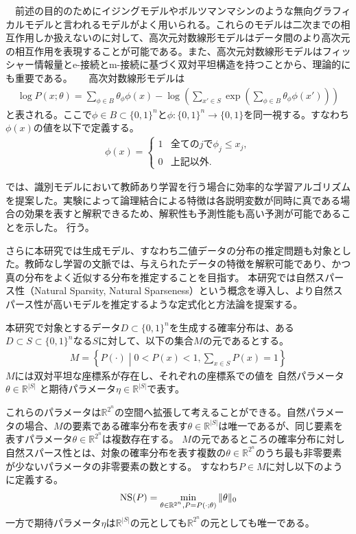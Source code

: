 　前述の目的のためにイジングモデルやボルツマンマシンのような無向グラフィカルモデルと言われるモデルがよく用いられる。これらのモデルは二次までの相互作用しか扱えないのに対して、高次元対数線形モデルはデータ間のより高次元の相互作用を表現することが可能である。また、高次元対数線形モデルはフィッシャー情報量とe-接続とm-接続に基づく双対平坦構造を持つことから、理論的にも重要である。
　
高次対数線形モデルは
\begin{align*}
    \log P(x;\theta) = \sum_{\phi\in B} \theta_\phi \phi(x)  - \log\left( \sum_{x'\in S} \exp\left( \sum_{\phi\in B} \theta_\phi \phi(x') \right) \right)    
\end{align*}
と表される。ここで$\phi \in B \subset \{0,1\}^n$と$\phi:\{0,1\}^n\to \{0,1\} $を同一視する。すなわち$\phi(x)$の値を以下で定義する。
\begin{align*}
    \phi(x)  = \begin{cases}
    1 & 全ての j で　\phi_j \le x_j, \\
    0 & 上記以外.
    \end{cases}
\end{align*}

\cite{LMY01}では、識別モデルにおいて教師あり学習を行う場合に効率的な学習アルゴリズムを提案した。実験によって論理結合による特徴は各説明変数が同時に真である場合の効果を表すと解釈できるため、解釈性も予測性能も高い予測が可能であることを示した。
行う。

さらに本研究では生成モデル、すなわち二値データの分布の推定問題も対象とした。教師なし学習の文脈では、与えられたデータの特徴を解釈可能であり、かつ真の分布をよく近似する分布を推定することを目指す。
本研究では自然スパース性（Natural Sparsity, Natural Sparseness）という概念を導入し、より自然スパース性が高いモデルを推定するような定式化と方法論を提案する。

本研究で対象とするデータ$D\subset\{0,1\}^n$を生成する確率分布は、ある$D\subset S\subset\{0,1\}^n$なる$S$に対して、以下の集合$M$の元であるとする。
\begin{align*}
    M = \left\{ P(\cdot)\middle| 0<P(x)<1, \sum_{x\in S} P(x) = 1 \right\}
\end{align*}
$M$には双対平坦な座標系が存在し、それぞれの座標系での値を
自然パラメータ$\theta \in \mathbb{R}^{|S|}$
と期待パラメータ$\eta \in \mathbb{R}^{|S|}$で表す。

これらのパラメータは$\mathbb{R}^{2^n}$の空間へ拡張して考えることができる。自然パラメータの場合、$M$の要素である確率分布を表す$\theta \in \mathbb{R}^{|S|}$は唯一であるが、同じ要素を表すパラメータ$\theta \in \mathbb{R}^{2^n}$は複数存在する。
$M$の元であるところの確率分布に対し自然スパース性とは、対象の確率分布を表す複数の$\theta\in\mathbb{R}^{2^n}$のうち最も非零要素が少ないパラメータの非零要素の数とする。
すなわち$P\in M$に対し以下のように定義する。
\begin{align*}
    {\rm NS}(P) =  \min_{\theta\in \mathbb{R}^{2^n}, P = P(\cdot;\theta)} \|\theta\|_0
\end{align*}
一方で期待パラメータ$\eta$は$\mathbb{R}^{|S|}$の元としても$\mathbb{R}^{2^n}$の元としても唯一である。

